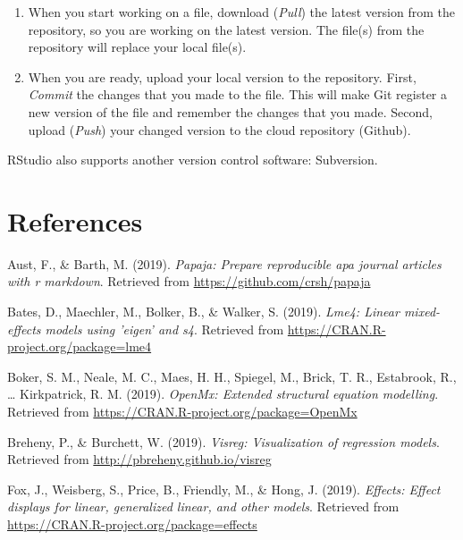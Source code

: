 \documentclass[doc,floatsintext]{apa6}
\begin{document}
\begin{enumerate}
\def\labelenumi{\arabic{enumi}.}
\item
  When you start working on a file, download (\emph{Pull}) the latest
  version from the repository, so you are working on the latest version.
  The file(s) from the repository will replace your local file(s).
\item
  When you are ready, upload your local version to the repository.
  First, \emph{Commit} the changes that you made to the file. This will
  make Git register a new version of the file and remember the changes
  that you made. Second, upload (\emph{Push}) your changed version to
  the cloud repository (Github).
\end{enumerate}

RStudio also supports another version control software: Subversion.

\newpage

\section{References}\label{references}

\begingroup
\setlength{\parindent}{-0.5in} \setlength{\leftskip}{0.5in}

\hypertarget{refs}{}
\hypertarget{ref-R-papaja}{}
Aust, F., \& Barth, M. (2019). \emph{Papaja: Prepare reproducible apa
journal articles with r markdown}. Retrieved from
\url{https://github.com/crsh/papaja}

\hypertarget{ref-R-lme4}{}
Bates, D., Maechler, M., Bolker, B., \& Walker, S. (2019). \emph{Lme4:
Linear mixed-effects models using 'eigen' and s4}. Retrieved from
\url{https://CRAN.R-project.org/package=lme4}

\hypertarget{ref-R-OpenMx}{}
Boker, S. M., Neale, M. C., Maes, H. H., Spiegel, M., Brick, T. R.,
Estabrook, R., \ldots{} Kirkpatrick, R. M. (2019). \emph{OpenMx:
Extended structural equation modelling}. Retrieved from
\url{https://CRAN.R-project.org/package=OpenMx}

\hypertarget{ref-R-visreg}{}
Breheny, P., \& Burchett, W. (2019). \emph{Visreg: Visualization of
regression models}. Retrieved from
\url{http://pbreheny.github.io/visreg}

\hypertarget{ref-R-effects}{}
Fox, J., Weisberg, S., Price, B., Friendly, M., \& Hong, J. (2019).
\emph{Effects: Effect displays for linear, generalized linear, and other
models}. Retrieved from \url{https://CRAN.R-project.org/package=effects}
\end{document}
